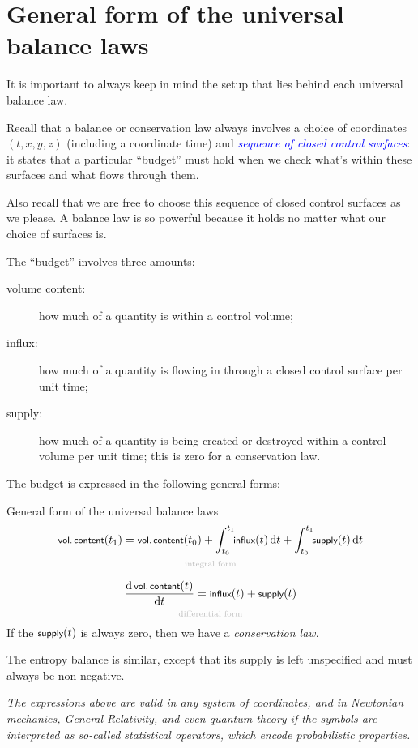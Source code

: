 \documentclass[a4paper,12pt,%
onecolumn,oneside,%
british%
]{memoir}
\newcommand*{\di}{\mathrm{d}}%
\renewcommand*{\|}[1][]{\nonscript\:#1\vert\nonscript\:\mathopen{}}
\newcommand*{\sect}{\S}%
\renewcommand*{\autoref}[2]{\sidepar{\vspace{-1ex}\footnotesize{\color{blue}\faIcon{%
angle-right%
}\enspace\sect\,\ref{#1} page\,\pageref{#1}}}\textcolor{blue}{#2}}
\newcommand*{\yti}{t_{0}}
\newcommand*{\ytf}{t_{1}}
\begin{document}
\section{General form of the universal balance laws}
\label{sec:common_formulation}

It is important to always keep in mind the setup that lies behind each universal balance law.

Recall that a balance or conservation law always involves a choice of coordinates $(t,x,y,z)$ (including a coordinate time) and \autoref{sec:conservation_laws}{\emph{sequence of closed control surfaces}}: it states that a particular \enquote{budget} must hold when we check what's within these surfaces and what flows through them.

Also recall that we are free to choose this sequence of closed control surfaces as we please. A balance law is so powerful because it holds no matter what our choice of surfaces is.

The \enquote{budget} involves three amounts:
\begin{description}
\item[volume content:] how much of a quantity is within a control volume;
\item[influx:] how much of a quantity is flowing in through a closed control surface per unit time;
\item[supply:] how much of a quantity is being created or destroyed within a control volume per unit time; this is zero for a conservation law.
\end{description}

The budget is expressed in the following general forms:
\begin{definition}{General form of the universal balance laws}
  \begin{equation*}
    \begin{gathered}[t]
      \underbracket[0pt]{\textsf{\footnotesize vol.\,content}(\ytf) = \textsf{\footnotesize vol.\,content}(\yti) + \int_{\yti}^{\ytf}\!\!\textsf{\footnotesize influx}(t)\,\di t + \int_{\yti}^{\ytf}\!\!\textsf{\footnotesize supply}(t)\,\di t}_{\mathclap{\text{\color{grey}integral form}}}
      \\[2\jot]
      \underbracket[0pt]{\frac{\di\,\textsf{\footnotesize vol.\,content}(t)}{\di t} = \textsf{\footnotesize influx}(t) + \textsf{\footnotesize supply}(t)}_{\mathclap{\text{\color{grey}differential form}}}
    \end{gathered}
  \end{equation*}
  If the $\textsf{\footnotesize supply}(t)$ is always zero, then we have a \emph{conservation law}.

  \smallskip

    The entropy balance is similar, except that its supply is left unspecified and must always be non-negative.

      \smallskip

  \emph{The expressions above are valid in any system of coordinates, and in Newtonian mechanics, General Relativity, and even quantum theory if the symbols are interpreted as so-called statistical operators, which encode probabilistic properties.}
\end{definition}
\end{document}
